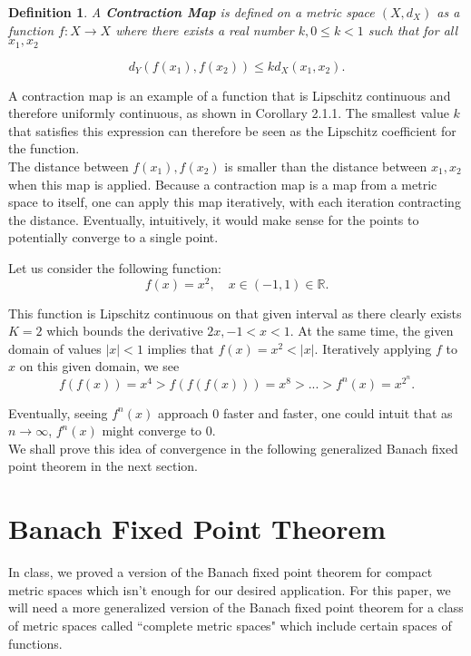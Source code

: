 \documentclass{article}
\newtheorem{definition}{Definition}
\theoremstyle{remark}
\begin{document}
\begin{definition}A \textbf{Contraction Map} is defined on a metric space $(X, d_X)$ as a function $f: X \to X$ where there exists a real number $k, 0\leq k<1$ such that for all $x_1, x_2$

$$d_Y(f(x_1),f(x_2)) \leq kd_X(x_1,x_2).$$

\end{definition}

A contraction map is an example of a function that is Lipschitz continuous and therefore uniformly continuous, as shown in Corollary 2.1.1. The smallest value $k$ that satisfies this expression can therefore be seen as the Lipschitz coefficient for the function. \\

The distance between $f(x_1), f(x_2)$ is smaller than the distance between $x_1, x_2$ when this map is applied. Because a contraction map is a map from a metric space to itself, one can apply this map iteratively, with each iteration contracting the distance. Eventually, intuitively, it would make sense for the points to potentially converge to a single point. 

Let us consider the following function:
$$f(x) = x^2,\quad x \in (-1,1) \in \mathbb{R}.$$

This function is Lipschitz continuous on that given interval as there clearly exists $K = 2$ which bounds the derivative $2x, -1<x<1$. At the same time, the given domain of values $|x| < 1$ implies that $f(x) = x^2 < |x|$. Iteratively applying $f$ to $x$ on this given domain, we see $$f(f(x)) = x^4 > f(f(f(x))) = x^8 > ... > f^n(x) = x^{2^n}.$$

Eventually, seeing $f^n(x)$ approach 0 faster and faster, one could intuit that as $n\to \infty$, $f^n(x)$ might converge to 0. \\

We shall prove this idea of convergence in the following generalized Banach fixed point theorem in the next section.\\ 

\section{Banach Fixed Point Theorem}

In class, we proved a version of the Banach fixed point theorem for compact metric spaces which isn't enough for our desired application. For this paper, we will need a more generalized version of the Banach fixed point theorem for a class of metric spaces called ``complete metric spaces" which include certain spaces of functions. \\
\end{document}
